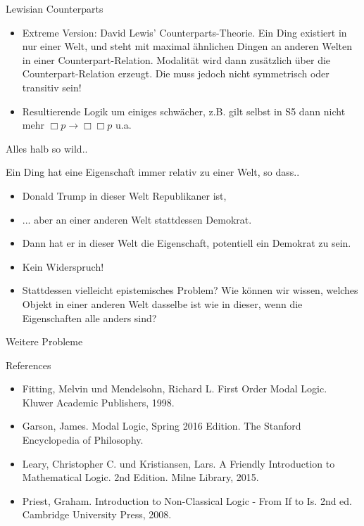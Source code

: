 \documentclass[12pt]{beamer}
\begin{document}
\begin{frame}{Lewisian Counterparts}

\begin{itemize}[<+->]
\item Extreme Version: David Lewis' Counterparts-Theorie. Ein Ding existiert in nur einer Welt, und steht mit maximal ähnlichen Dingen an anderen Welten in einer Counterpart-Relation. Modalität wird dann zusätzlich über die Counterpart-Relation erzeugt. Die muss jedoch nicht symmetrisch oder transitiv sein!
\item Resultierende Logik um einiges schwächer, z.B. gilt selbst in S5 dann nicht mehr $\Box p \to \Box\Box p$ u.a.
\end{itemize}

\end{frame}

\begin{frame}{Alles halb so wild..}

Ein Ding hat eine Eigenschaft immer relativ zu einer Welt, so dass..
\begin{itemize}[<+->]
\item Donald Trump in dieser Welt Republikaner ist,
\item ... aber an einer anderen Welt stattdessen Demokrat.
\item Dann hat er in dieser Welt die Eigenschaft, potentiell ein Demokrat zu sein.
\item Kein Widerspruch!
\item Stattdessen vielleicht epistemisches Problem? Wie können wir wissen, welches Objekt in einer anderen Welt dasselbe ist wie in dieser, wenn die Eigenschaften alle anders sind?
\end{itemize}
\end{frame}

\begin{frame}{Weitere Probleme}



\end{frame}

\begin{frame}{References}
  
  \begin{itemize}
  \item Fitting, Melvin und Mendelsohn, Richard L. First Order Modal
    Logic. Kluwer Academic Publishers, 1998.
  \item Garson, James. Modal Logic, Spring 2016 Edition. The Stanford
    Encyclopedia of Philosophy.
  \item Leary, Christopher C. und Kristiansen, Lars. A Friendly
    Introduction to Mathematical Logic. 2nd Edition. Milne Library,
    2015.
  \item Priest, Graham. Introduction to Non-Classical Logic - From If
    to Is. 2nd ed. Cambridge University Press, 2008.

  \end{itemize}

\end{frame}
\end{document}
